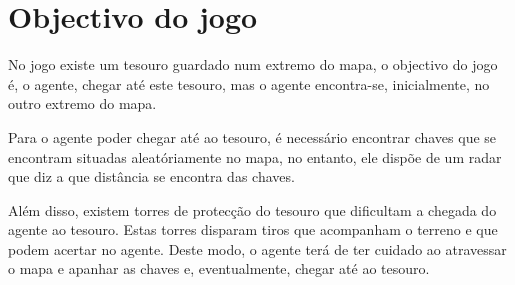 

\section{Objectivo do jogo}

	No jogo existe um tesouro guardado num extremo do mapa, o objectivo do jogo é, o agente,
chegar até este tesouro, mas o agente encontra-se, inicialmente, no outro extremo do mapa.
	
	Para o agente poder chegar até ao tesouro, é necessário encontrar chaves que se encontram 
situadas aleatóriamente no mapa, no entanto, ele dispõe de um radar que diz a que distância se 
encontra das chaves. 
	
	Além disso, existem torres de protecção do tesouro que dificultam a chegada do agente ao tesouro.
Estas torres disparam tiros que acompanham o terreno e que podem acertar no agente. Deste modo,
o agente terá de ter cuidado ao atravessar o mapa e apanhar as chaves e, eventualmente, chegar 
até ao tesouro.